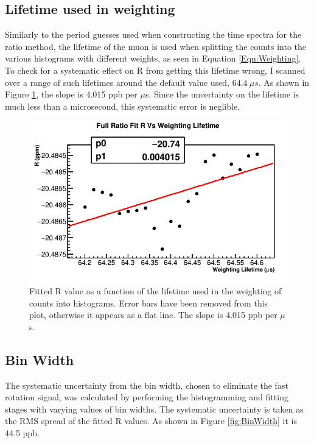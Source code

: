 	\subsection{Lifetime used in weighting}
	\label{SubSec:LifetimeWeighting}

		Similarly to the \gmtwo period guesses used when constructing the time spectra for the ratio method, the lifetime of the muon is used when splitting the counts into the various histograms with different weights, as seen in Equation \ref{Eqn:Weighting}. To check for a systematic effect on R from getting this lifetime wrong, I scanned over a range of such lifetimes around the default value used, $\SI{64.4}{\mu s}$. As shown in Figure \ref{fig:weightingLifetime}, the slope is 4.015 ppb per $\mu$s. Since the uncertainty on the lifetime is much less than a microsecond, this systematic error is neglible.

		\begin{figure}[]
			\centering
			\includegraphics[width=.6\textwidth]{RatioCBO_R_Vs_weightingLifetime_Canv}
		    \caption[weightingLifetime]{Fitted R value as a function of the lifetime used in the weighting of counts into histograms. Error bars have been removed from this plot, otherwise it appears as a flat line. The slope is 4.015 ppb per $\mu$s.}
		    \label{fig:weightingLifetime}
		\end{figure}


	\subsection{Bin Width}

		The systematic uncertainty from the bin width, chosen to eliminate the fast rotation signal, was calculated by performing the histogramming and fitting stages with varying values of bin widths. The systematic uncertainty is taken as the RMS spread of the fitted R values. As shown in Figure \ref{fig:BinWidth} it is 44.5 ppb.

